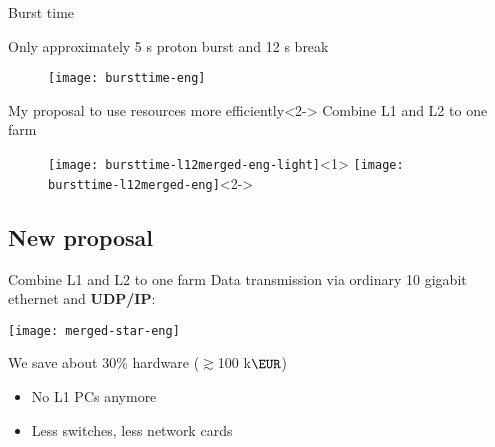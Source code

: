 \begin{frame}{Burst time}{}
	\vspace{-2mm}
	\begin{block}{}
		Only approximately 5 s proton burst and 12 s break
	\end{block}

	\begin{figure}[htp]
		\begin{center}
		  \texttt{[image: bursttime-eng]}
		\end{center}
	\end{figure}
	
	\vspace{-5mm}
	\begin{exampleblock}{My proposal to use resources more efficiently}<2->
		Combine L1 and L2 to one farm
	\end{exampleblock}

	\begin{figure}[htp]
		\begin{center}
		 \texttt{[image: bursttime-l12merged-eng-light]}<1>
		 \texttt{[image: bursttime-l12merged-eng]}<2->
		\end{center}
	\end{figure}
\end{frame}



\subsection{New proposal}

\begin{frame}{Combine L1 and L2 to one farm}{}
	Data transmission via ordinary 10 gigabit ethernet and \textbf{UDP/IP}:
	\begin{center} 
		\texttt{[image: merged-star-eng]}
	\end{center} 
	\begin{exampleblock}{We save about 30\% hardware ($\gtrsim$100 k$\EUR$)}
		\begin{itemize}
		  \item No L1 PCs anymore
		  \item Less switches, less network cards
		\end{itemize}
	\end{exampleblock}
\end{frame}

